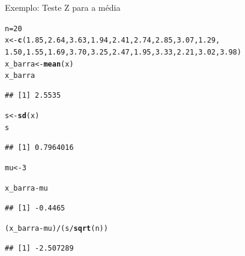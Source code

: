 \documentclass{beamer}\usepackage[]{graphicx}\usepackage[]{color}
\makeatletter
\newcommand{\hlnum}[1]{\textcolor[rgb]{0.686,0.059,0.569}{#1}}%
\newcommand{\hlopt}[1]{\textcolor[rgb]{0,0,0}{#1}}%
\newcommand{\hlstd}[1]{\textcolor[rgb]{0.345,0.345,0.345}{#1}}%
\newcommand{\hlkwb}[1]{\textcolor[rgb]{0.69,0.353,0.396}{#1}}%
\newcommand{\hlkwd}[1]{\textcolor[rgb]{0.737,0.353,0.396}{\textbf{#1}}}%
\newenvironment{kframe}{%
 \def\at@end@of@kframe{}%
 \ifinner\ifhmode%
  \def\at@end@of@kframe{\end{minipage}}%
  \begin{minipage}{\columnwidth}%
 \fi\fi%
 \def\FrameCommand##1{\hskip\@totalleftmargin \hskip-\fboxsep
 \colorbox{shadecolor}{##1}\hskip-\fboxsep
     \hskip-\linewidth \hskip-\@totalleftmargin \hskip\columnwidth}%
 \MakeFramed {\advance\hsize-\width
   \@totalleftmargin\z@ \linewidth\hsize
   \@setminipage}}%
 {\par\unskip\endMakeFramed%
 \at@end@of@kframe}
\newenvironment{knitrout}{}{} %
\renewenvironment{knitrout}{\setlength{\topsep}{0mm}}{}
\makeatother
\begin{document}
\begin{frame}[fragile]{Exemplo: Teste Z para a média}

\begin{knitrout}\tiny
{}\color{fgcolor}\begin{kframe}
\begin{alltt}
\hlstd{n} \hlkwb{=} \hlnum{20}
\hlstd{x} \hlkwb{<-}  \hlkwd{c}\hlstd{(}\hlnum{1.85}\hlstd{,} \hlnum{2.64}\hlstd{,} \hlnum{3.63}\hlstd{,} \hlnum{1.94}\hlstd{,} \hlnum{2.41}\hlstd{,} \hlnum{2.74}\hlstd{,} \hlnum{2.85}\hlstd{,} \hlnum{3.07}\hlstd{,} \hlnum{1.29}\hlstd{,}
        \hlnum{1.50}\hlstd{,} \hlnum{1.55}\hlstd{,} \hlnum{1.69}\hlstd{,} \hlnum{3.70}\hlstd{,} \hlnum{3.25}\hlstd{,} \hlnum{2.47}\hlstd{,} \hlnum{1.95}\hlstd{,} \hlnum{3.33}\hlstd{,} \hlnum{2.21}\hlstd{,} \hlnum{3.02}\hlstd{,} \hlnum{3.98}\hlstd{)}
\hlstd{x_barra} \hlkwb{<-} \hlkwd{mean}\hlstd{(x)}
\hlstd{x_barra}
\end{alltt}
\begin{verbatim}
## [1] 2.5535
\end{verbatim}
\begin{alltt}
\hlstd{s} \hlkwb{<-} \hlkwd{sd}\hlstd{(x)}
\hlstd{s}
\end{alltt}
\begin{verbatim}
## [1] 0.7964016
\end{verbatim}
\begin{alltt}
\hlstd{mu} \hlkwb{<-} \hlnum{3}

\hlstd{x_barra}\hlopt{-}\hlstd{mu}
\end{alltt}
\begin{verbatim}
## [1] -0.4465
\end{verbatim}
\begin{alltt}
\hlstd{(x_barra}\hlopt{-}\hlstd{mu)}\hlopt{/}\hlstd{(s}\hlopt{/}\hlkwd{sqrt}\hlstd{(n))}
\end{alltt}
\begin{verbatim}
## [1] -2.507289
\end{verbatim}
\end{kframe}
\end{knitrout}
\end{frame} 
\end{document}
